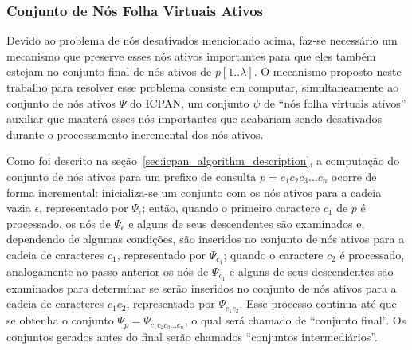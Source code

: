 \subsubsection{Conjunto de Nós Folha Virtuais Ativos}
\label{sec:virtual_leaves_node-set}

Devido ao problema de nós desativados mencionado acima, faz-se necessário um mecanismo que preserve esses nós ativos importantes para que eles também estejam no conjunto final de nós ativos de $p[1..\lambda]$. O mecanismo proposto neste trabalho para resolver esse problema consiste em computar, simultaneamente ao conjunto de nós ativos $\Psi$ do ICPAN, um conjunto $\psi$ de ``nós folha virtuais ativos'' auxiliar que manterá esses nós importantes que acabariam sendo desativados durante o processamento incremental dos nós ativos. 

Como foi descrito na seção~\ref{sec:icpan_algorithm_description}, a computação do conjunto de nós ativos para um prefixo de consulta $p = c_{1}c_{2}c_{3}...c_{n}$ ocorre de forma incremental: inicializa-se um conjunto com os nós ativos para a cadeia vazia $\epsilon$, representado por $\Psi_{\epsilon}$; então, quando o primeiro caractere $c_{1}$ de $p$ é processado, os nós de $\Psi_{\epsilon}$ e alguns de seus descendentes são examinados e, dependendo de algumas condições, são inseridos no conjunto de nós ativos para a cadeia de caracteres $c_{1}$, representado por $\Psi_{c_{1}}$; quando o caractere $c_{2}$ é processado, analogamente ao passo anterior os nós de $\Psi_{c_{1}}$ e alguns de seus descendentes são examinados para determinar se serão inseridos no conjunto de nós ativos para a cadeia de caracteres $c_{1}c_{2}$, representado por $\Psi_{c_{1}c_{2}}$. Esse processo continua até que se obtenha o conjunto $\Psi_{p} = \Psi_{c_{1}c_{2}c_{3}...c_{n}}$, o qual será chamado de ``conjunto final''. Os conjuntos gerados antes do final serão chamados ``conjuntos intermediários''.

